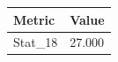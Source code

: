 \begin{tabular}{ll}
\toprule
Metric & Value \\
\midrule
Stat\_18 & 27.000 \\
\bottomrule
\end{tabular}